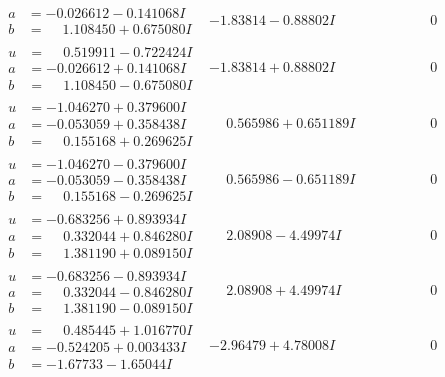 \documentclass[1p]{elsarticle_modified}
\theoremstyle{definition}
\begin{document}
$$\begin{array}{c|c|c}
\begin{aligned}
a &= -0.026612 - 0.141068 I \\
b &= \phantom{-}1.108450 + 0.675080 I\end{aligned}
 & -1.83814 - 0.88802 I & \phantom{-0.000000 } 0 \\ \hline\begin{aligned}
u &= \phantom{-}0.519911 - 0.722424 I \\
a &= -0.026612 + 0.141068 I \\
b &= \phantom{-}1.108450 - 0.675080 I\end{aligned}
 & -1.83814 + 0.88802 I & \phantom{-0.000000 } 0 \\ \hline\begin{aligned}
u &= -1.046270 + 0.379600 I \\
a &= -0.053059 + 0.358438 I \\
b &= \phantom{-}0.155168 + 0.269625 I\end{aligned}
 & \phantom{-}0.565986 + 0.651189 I & \phantom{-0.000000 } 0 \\ \hline\begin{aligned}
u &= -1.046270 - 0.379600 I \\
a &= -0.053059 - 0.358438 I \\
b &= \phantom{-}0.155168 - 0.269625 I\end{aligned}
 & \phantom{-}0.565986 - 0.651189 I & \phantom{-0.000000 } 0 \\ \hline\begin{aligned}
u &= -0.683256 + 0.893934 I \\
a &= \phantom{-}0.332044 + 0.846280 I \\
b &= \phantom{-}1.381190 + 0.089150 I\end{aligned}
 & \phantom{-}2.08908 - 4.49974 I & \phantom{-0.000000 } 0 \\ \hline\begin{aligned}
u &= -0.683256 - 0.893934 I \\
a &= \phantom{-}0.332044 - 0.846280 I \\
b &= \phantom{-}1.381190 - 0.089150 I\end{aligned}
 & \phantom{-}2.08908 + 4.49974 I & \phantom{-0.000000 } 0 \\ \hline\begin{aligned}
u &= \phantom{-}0.485445 + 1.016770 I \\
a &= -0.524205 + 0.003433 I \\
b &= -1.67733 - 1.65044 I\end{aligned}
 & -2.96479 + 4.78008 I & \phantom{-0.000000 } 0 \\ \hline\begin{aligned}

\end{aligned}
\end{array}$$
\end{document}
